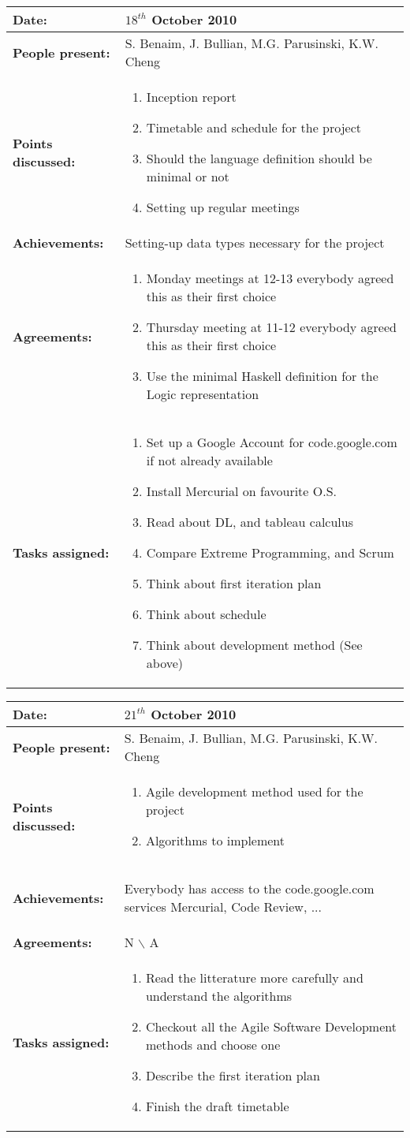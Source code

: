\documentclass[12pt,a4paper]{article}
\newcommand{\meeting}[6]{%
\begin{center}%
\begin{longtable}{| p{3.5cm} | | p{13cm} |}%
\hline%
\textbf{Date:} & #1 \\%
\hline%
\textbf{People present:} &#2 \\%
\hline%
\textbf{Points discussed:} &#3\\%
\hline%
\textbf{Achievements:} &#4 \\%
\hline%
\textbf{Agreements:} &#5 \\%
\hline%
\textbf{Tasks assigned:} &#6  \\%
\hline%
\end{longtable}%
\end{center}%
\bigbreak
}
\begin{document}
\meeting{$18^{th}$ October 2010}%
{S. Benaim, J. Bullian, M.G. Parusinski, K.W. Cheng}%
{ \begin{enumerate} \item Inception report
\item Timetable and schedule for the project
\item Should the language definition should be minimal or not
\item Setting up regular meetings
\end{enumerate} }%
{Setting-up data types necessary for the project}%
{\begin{enumerate}
\item Monday meetings at 12-13 everybody agreed this as their first choice
\item Thursday meeting at 11-12 everybody agreed this as their first choice
\item Use the minimal Haskell definition for the Logic representation
\end{enumerate}}
{ \begin{enumerate}
\item Set up a Google Account for code.google.com if not already available
\item Install Mercurial on favourite O.S.
\item Read about DL, and tableau calculus
\item Compare Extreme Programming, and Scrum
\item Think about first iteration plan
\item Think about schedule
\item Think about development method (See above)
\end{enumerate}}%

\meeting{$21^{th}$ October 2010}%
{S. Benaim, J. Bullian, M.G. Parusinski, K.W. Cheng}%
{ \begin{enumerate} 
\item Agile development method used for the project
\item Algorithms to implement
\end{enumerate} }%
{\begin{enumerate}
Everybody has access to the code.google.com services Mercurial, Code Review, ...
\end{enumerate}}%
{N $\backslash$ A}
{ \begin{enumerate}
\item Read the litterature more carefully and understand the algorithms
\item Checkout all the Agile Software Development methods and choose one
\item Describe the first iteration plan
\item Finish the draft timetable
\end{enumerate}}%
\end{document}
